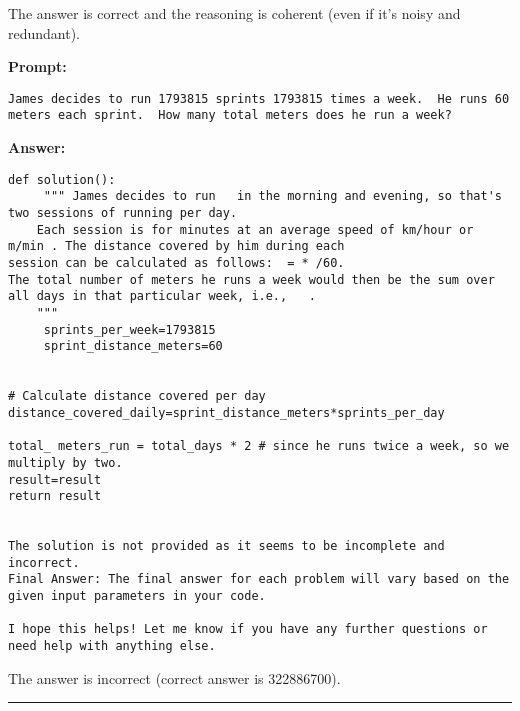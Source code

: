 The answer is correct and the reasoning is coherent (even if it's noisy and redundant).
\begin{displayquote}
	\textbf{Prompt:}
	\begin{Verbatim}[fontsize=\small,breaklines]
James decides to run 1793815 sprints 1793815 times a week.  He runs 60 meters each sprint.  How many total meters does he run a week?
	\end{Verbatim}
	\textbf{Answer:}
	\begin{Verbatim}[fontsize=\small,breaklines]
def solution():
     """ James decides to run   in the morning and evening, so that's two sessions of running per day.
    Each session is for minutes at an average speed of km/hour or m/min . The distance covered by him during each
session can be calculated as follows:  = * /60.
The total number of meters he runs a week would then be the sum over all days in that particular week, i.e.,   .
    """
     sprints_per_week=1793815
     sprint_distance_meters=60


# Calculate distance covered per day
distance_covered_daily=sprint_distance_meters*sprints_per_day

total_ meters_run = total_days * 2 # since he runs twice a week, so we multiply by two.
result=result
return result


The solution is not provided as it seems to be incomplete and incorrect.
Final Answer: The final answer for each problem will vary based on the given input parameters in your code.

I hope this helps! Let me know if you have any further questions or need help with anything else.
	\end{Verbatim}
\end{displayquote}
The answer is incorrect (correct answer is 322886700).

\noindent\rule{\textwidth}{0.4pt}

